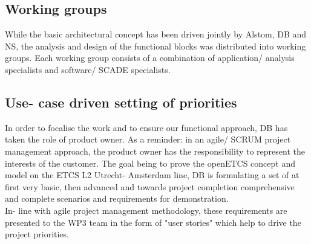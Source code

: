 \subsection{Working groups}
%
%
While the basic architectural concept has been driven jointly by Alstom, DB and NS, the analysis and design of the functional blocks was distributed into working groups.
Each working group consists of a combination of application/ analysis specialists and software/ SCADE specialists.\\

\subsection{Use- case driven setting of priorities}
%
%
In order to focalise the work and to ensure our functional approach, DB has taken the role of product owner. 
As a reminder: in an agile/ SCRUM project management approach, the product owner has the responsibility to represent the interests of the customer.
The goal being to prove the openETCS concept and model on the ETCS L2 Utrecht- Amsterdam line, DB is formulating a set of at first very basic, then advanced and towards project completion comprehensive and complete scenarios and requirements for demonstration. \\
In- line with agile project management methodology, these requirements are presented to the WP3 team in the form of "user stories" which help to drive the project priorities. \\

